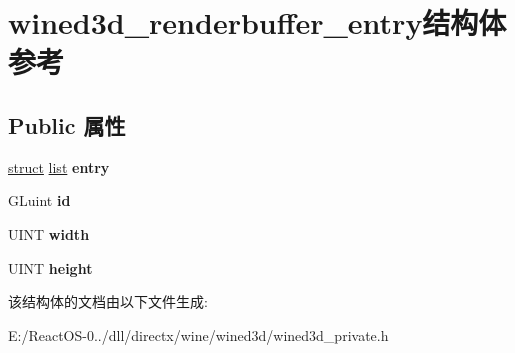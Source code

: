 \hypertarget{structwined3d__renderbuffer__entry}{}\section{wined3d\+\_\+renderbuffer\+\_\+entry结构体 参考}
\label{structwined3d__renderbuffer__entry}
\subsection*{Public 属性}
\begin{DoxyCompactItemize}
\item 
\mbox{\label{structwined3d__renderbuffer__entry_af6fcb543f1e8394276e392e824ed93c1}} 
\hyperlink{interfacestruct}{struct} \hyperlink{classlist}{list} {\bfseries entry}
\item 
\mbox{\label{structwined3d__renderbuffer__entry_afc134b9fec0b99bfde0c64467103126b}} 
G\+Luint {\bfseries id}
\item 
\mbox{\label{structwined3d__renderbuffer__entry_a68788bd69edf3f79f23ac4ee44672a46}} 
U\+I\+NT {\bfseries width}
\item 
\mbox{\label{structwined3d__renderbuffer__entry_aeef07bd8867c706e7ac4a7cb84a4b2bf}} 
U\+I\+NT {\bfseries height}
\end{DoxyCompactItemize}


该结构体的文档由以下文件生成\+:\begin{DoxyCompactItemize}
\item 
E\+:/\+React\+O\+S-\/0../dll/directx/wine/wined3d/wined3d\+\_\+private.\+h\end{DoxyCompactItemize}

